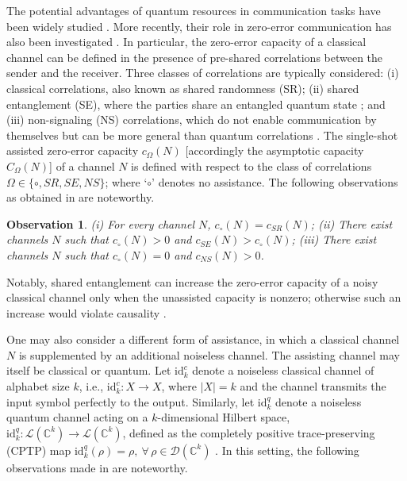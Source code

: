 \documentclass[12pt,a4paper]{article}
\newtheorem{observation}{Observation}
\begin{document}
The potential advantages of quantum resources in communication tasks have been widely studied \cite{Gisin2002,Gisin2007,Buhrman2010,khatri2024,Usenko2025}. More recently, their role in zero-error communication has also been investigated \cite{Cubitt2010,Cubitt2011,Prevedel2011,Yadavalli2022,Alimuddin2023,Agarwal2026}. In particular, the zero-error capacity of a classical channel can be defined in the presence of pre-shared correlations between the sender and the receiver. Three classes of correlations are typically considered: (i) classical correlations, also known as shared randomness (SR); (ii) shared entanglement (SE), where the parties share an entangled quantum state \cite{Horodecki2009}; and (iii) non-signaling (NS) correlations, which do not enable communication by themselves but can be more general than quantum correlations \cite{Brunner2014}. The single-shot assisted zero-error capacity $c_{\Omega}(N)$ [accordingly the asymptotic capacity $C_{\Omega}(N)$] of a channel $N$ is defined with respect to the class of correlations $\Omega\in\{\circ, SR,SE,NS\}$; where `$\circ$' denotes no assistance. The following observations as obtained in \cite{Cubitt2010,Cubitt2011} are noteworthy.

\begin{observation}\label{obs1}
(i) For every channel $N$, $c_\circ(N)=c_{SR}(N)$;
(ii) There exist channels $N$ such that $c_\circ(N)>0$ and $c_{SE}(N)>c_\circ(N)$;
(iii) There exist channels $N$ such that $c_\circ(N)=0$ and $c_{NS}(N)>0$.
\end{observation}
\noindent Notably, shared entanglement can increase the zero-error capacity of a noisy classical channel only when the unassisted capacity is nonzero; otherwise such an increase would violate causality \cite{Cubitt2010}.

One may also consider a different form of assistance, in which a classical channel $N$ is supplemented by an additional noiseless channel. The assisting channel may itself be classical or quantum. Let $\mathrm{id}^c_k$ denote a noiseless classical channel of alphabet size $k$, i.e., $\mathrm{id}^c_k : X \to X$, where $|X|=k$ and the channel transmits the input symbol perfectly to the output. Similarly, let $\mathrm{id}^q_k$ denote a noiseless quantum channel acting on a $k$-dimensional Hilbert space, $\mathrm{id}^q_k : \mathcal{L}(\mathbb{C}^k) \to \mathcal{L}(\mathbb{C}^k)$, defined as the completely positive trace-preserving (CPTP) map $\mathrm{id}^q_k(\rho)=\rho,~ \forall\, \rho \in \mathcal{D}(\mathbb{C}^k)$ \cite{Kraus1983}. In this setting, the following observations made in \cite{Ambuj2026} are noteworthy.
\end{document}
